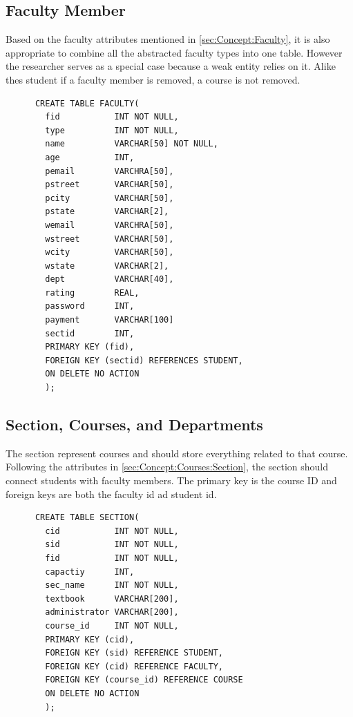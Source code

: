 \documentclass{article}
\begin{document}
  \subsection{Faculty Member}
    Based on the faculty attributes mentioned in \ref{sec:Concept:Faculty}, it is also appropriate to combine all the abstracted faculty types into one table.  However the researcher serves as a special case because a weak entity relies on it.  Alike thes student if a faculty member is removed, a course is not removed.

    \begin{lstlisting}
      CREATE TABLE FACULTY(
        fid           INT NOT NULL,
        type          INT NOT NULL,
        name          VARCHAR[50] NOT NULL,
        age           INT,
        pemail        VARCHRA[50],
        pstreet       VARCHAR[50],
        pcity         VARCHAR[50],
        pstate        VARCHAR[2],
        wemail        VARCHRA[50],
        wstreet       VARCHAR[50],
        wcity         VARCHAR[50],
        wstate        VARCHAR[2],
        dept          VARCHAR[40],
        rating        REAL,
        password      INT,
        payment       VARCHAR[100]
        sectid        INT,
        PRIMARY KEY (fid),
        FOREIGN KEY (sectid) REFERENCES STUDENT,
        ON DELETE NO ACTION
        );
    \end{lstlisting}

  \subsection{Section, Courses, and Departments}
    The section represent courses and should store everything related to that course.  Following the attributes in \ref{sec:Concept:Courses:Section}, the section should connect students with faculty members.  The primary key is the course ID and foreign keys are both the faculty id ad student id.

    \begin{lstlisting}
      CREATE TABLE SECTION(
        cid           INT NOT NULL,
        sid           INT NOT NULL,
        fid           INT NOT NULL,
        capactiy      INT,
        sec_name      INT NOT NULL,
        textbook      VARCHAR[200],
        administrator VARCHAR[200],
        course_id     INT NOT NULL,
        PRIMARY KEY (cid),
        FOREIGN KEY (sid) REFERENCE STUDENT,
        FOREIGN KEY (cid) REFERENCE FACULTY,
        FOREIGN KEY (course_id) REFERENCE COURSE
        ON DELETE NO ACTION
        );
    \end{lstlisting}
\end{document}
